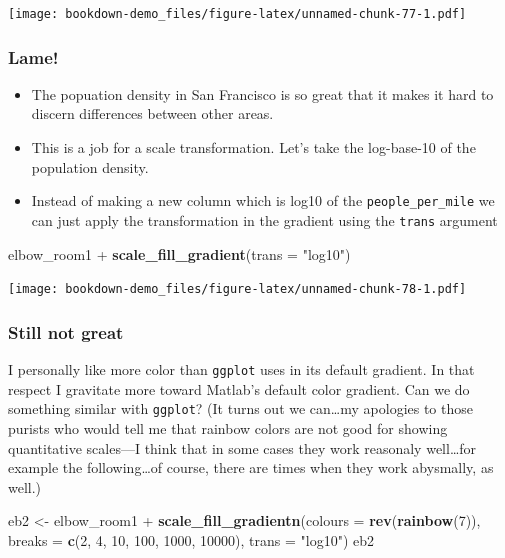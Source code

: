 \documentclass[]{book}
\newenvironment{Shaded}{\begin{snugshade}}{\end{snugshade}}
\newcommand{\KeywordTok}[1]{\textcolor[rgb]{0.13,0.29,0.53}{\textbf{{#1}}}}
\newcommand{\DataTypeTok}[1]{\textcolor[rgb]{0.13,0.29,0.53}{{#1}}}
\newcommand{\DecValTok}[1]{\textcolor[rgb]{0.00,0.00,0.81}{{#1}}}
\newcommand{\StringTok}[1]{\textcolor[rgb]{0.31,0.60,0.02}{{#1}}}
\newcommand{\NormalTok}[1]{{#1}}
\providecommand{\tightlist}{%
  \setlength{\itemsep}{0pt}\setlength{\parskip}{0pt}}
\theoremstyle{definition}
\theoremstyle{definition}
\theoremstyle{remark}
\begin{document}
\texttt{[image: bookdown-demo\_files/figure-latex/unnamed-chunk-77-1.pdf]}

\subsubsection{Lame!}\label{lame}

\begin{itemize}
\tightlist
\item
  The popuation density in San Francisco is so great that it makes it
  hard to discern differences between other areas.
\item
  This is a job for a scale transformation. Let's take the log-base-10
  of the population density.
\item
  Instead of making a new column which is log10 of the
  \texttt{people\_per\_mile} we can just apply the transformation in the
  gradient using the \texttt{trans} argument
\end{itemize}

\begin{Shaded}
\begin{Highlighting}[]
\NormalTok{elbow_room1 +}\StringTok{ }\KeywordTok{scale_fill_gradient}\NormalTok{(}\DataTypeTok{trans =} \StringTok{"log10"}\NormalTok{)}
\end{Highlighting}
\end{Shaded}

\texttt{[image: bookdown-demo\_files/figure-latex/unnamed-chunk-78-1.pdf]}

\subsubsection{Still not great}\label{still-not-great}

I personally like more color than \texttt{ggplot} uses in its default
gradient. In that respect I gravitate more toward Matlab's default color
gradient. Can we do something similar with \texttt{ggplot}? (It turns
out we can\ldots{}my apologies to those purists who would tell me that
rainbow colors are not good for showing quantitative scales---I think
that in some cases they work reasonaly well\ldots{}for example the
following\ldots{}of course, there are times when they work abysmally, as
well.)

\begin{Shaded}
\begin{Highlighting}[]
\NormalTok{eb2 <-}\StringTok{ }\NormalTok{elbow_room1 +}\StringTok{ }
\StringTok{    }\KeywordTok{scale_fill_gradientn}\NormalTok{(}\DataTypeTok{colours =} \KeywordTok{rev}\NormalTok{(}\KeywordTok{rainbow}\NormalTok{(}\DecValTok{7}\NormalTok{)),}
                         \DataTypeTok{breaks =} \KeywordTok{c}\NormalTok{(}\DecValTok{2}\NormalTok{, }\DecValTok{4}\NormalTok{, }\DecValTok{10}\NormalTok{, }\DecValTok{100}\NormalTok{, }\DecValTok{1000}\NormalTok{, }\DecValTok{10000}\NormalTok{),}
                         \DataTypeTok{trans =} \StringTok{"log10"}\NormalTok{)}
\NormalTok{eb2}
\end{Highlighting}
\end{Shaded}
\end{document}
